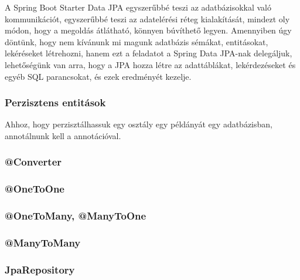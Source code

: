 A Spring Boot Starter Data JPA egyszerűbbé teszi az adatbázisokkal való kommunikációt, egyszerűbbé teszi az adatelérési réteg kialakítását, mindezt oly módon, hogy a megoldás átlátható, könnyen búvíthető legyen. Amennyiben úgy döntünk, hogy nem kívánunk mi magunk adatbázis sémákat, entitásokat, lekéréseket létrehozni, hanem ezt a feladatot a Spring Data JPA-nak delegáljuk, lehetőségünk van arra, hogy a JPA hozza létre az adattáblákat, lekérdezéseket és egyéb SQL parancsokat, és ezek eredményét kezelje.

\subsubsection{Perzisztens entitások}

Ahhoz, hogy perzisztálhassuk egy osztály egy példányát egy adatbázisban, annotálnunk kell a  annotációval.

\subsubsection{@Converter}

\subsubsection{@OneToOne}

\subsubsection{@OneToMany, @ManyToOne}

\subsubsection{@ManyToMany}

\subsubsection{JpaRepository}